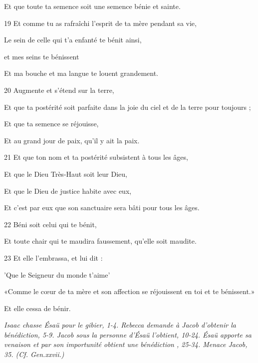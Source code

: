 \par     Et que toute ta semence soit une semence bénie et sainte.
\par    
\par 19 Et comme tu as rafraîchi l'esprit de ta mère pendant sa vie,  
\par     Le sein de celle qui t'a enfanté te bénit ainsi,
\par    
\par     [Mon affection] et mes seins te bénissent  
\par     Et ma bouche et ma langue te louent grandement.
\par    
\par 20 Augmente et s'étend sur la terre,  
\par     Et que ta postérité soit parfaite dans la joie du ciel et de la terre pour toujours ;
\par    
\par     Et que ta semence se réjouisse,  
\par     Et au grand jour de paix, qu'il y ait la paix.
\par    
\par 21 Et que ton nom et ta postérité subsistent à tous les âges,  
\par     Et que le Dieu Très-Haut soit leur Dieu,
\par    
\par     Et que le Dieu de justice habite avec eux,  
\par     Et c'est par eux que son sanctuaire sera bâti pour tous les âges.
\par    
\par 22 Béni soit celui qui te bénit,  
\par     Et toute chair qui te maudira faussement, qu'elle soit maudite.
\par    
\par 23 Et elle l'embrassa, et lui dit :  
\par     'Que le Seigneur du monde t'aime'  
\par     «Comme le cœur de ta mère et son affection se réjouissent en toi et te bénissent.»
\par     Et elle cessa de bénir.


\textit{Isaac chasse Ésaü pour le gibier, 1-4. Rebecca demande à Jacob d'obtenir la bénédiction, 5-9. Jacob sous la personne d'Ésaü l'obtient, 10-24. Ésaü apporte sa venaison et par son importunité obtient une bénédiction , 25-34. Menace Jacob, 35. (Cf. Gen.xxvii.)}

